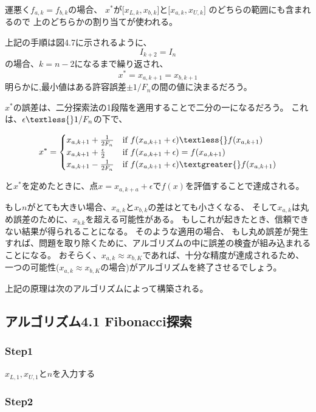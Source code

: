 運悪く$f_{a,k} = f_{b,k}$の場合、
$x^{\ast}$が$\lbrack x_{L,k} ,
x_{b,k} \rbrack$と$\lbrack x_{a,k}
, x_{U,k} \rbrack$ のどちらの範囲にも含まれるので
上のどちらかの割り当てが使われる。

上記の手順は図4.7に示されるように、 $$ I_{k+2} = I_n$$
の場合、$k=n-2$になるまで繰り返され、 $$
x^\ast = x_{a,k+1} = x_{b, k+1} $$
明らかに,最小値はある許容誤差$\pm 1 / F_n$の間の値に決まるだろう。

$x^\ast$の誤差は、二分探索法の1段階を適用することで二分の一になるだろう。
これは、$\epsilon \textless{} 1 / F_n$の下で、

$$ x^\ast = \begin{cases}
x_{a,k+1} + \frac{1}{2F_n} & \text{if} \ f(x_{a,k+1} + \epsilon ) \textless{} f(x_{a,k+1}) \\
x_{a,k+1} + \frac{\epsilon}{2} & \text{if} \ f(x_{a,k+1} + \epsilon ) = f(x_{a,k+1}) \\
x_{a,k+1} - \frac{1}{2F_n} & \text{if} \ f(x_{a,k+1} + \epsilon ) \textgreater{} f(x_{a,k+1}) \\
\end{cases} $$

と$x^\ast$を定めたときに、点$x=x_{a,k+a} +
\epsilon$で$f(x)$を評価することで達成される。

もし$n$がとても大きい場合、$x_{a,k}$と$x_{b,k}$の差はとても小さくなる、
そして$x_{a,k}$は丸め誤差のために、$x_{b.k}$を超える可能性がある。
もしこれが起きたとき、信頼できない結果が得られることになる。
そのような適用の場合、
もし丸め誤差が発生すれば、問題を取り除くために、アルゴリズムの中に誤差の検査が組み込まれることになる。
おそらく、$x_{a,k} \approx
x_{b,K}$であれば、十分な精度が達成されるため、
一つの可能性($x_{a,k} \approx
x_{b,K}$の場合)がアルゴリズムを終了させるでしょう。

上記の原理は次のアルゴリズムによって構築される。

\newpage

\subsection*{アルゴリズム4.1 Fibonacci探索}\label{-4-1-fibonacci-}

\subsubsection*{Step1}\label{step1}

$x_{L,1},x_{U,1}$と$n$を入力する

\subsubsection*{Step2}\label{step2}

